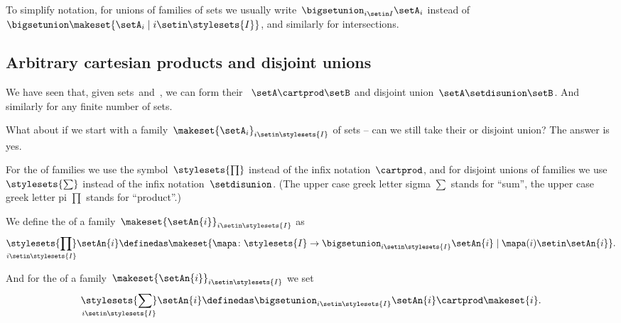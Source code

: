 \begin{remark}
    To simplify notation, for unions of families of sets we usually write~$\bigsetunion_{i \setin I} \setA_i $ instead of~$\bigsetunion \makeset{  \setA_i \mid i \setin\stylesets{I} }$, and similarly for intersections.
\end{remark}

\subsection{Arbitrary cartesian products and disjoint unions}

We have seen that, given sets~\setA and~\setB, we can form their ~$\setA \cartprod \setB$ and disjoint union~$\setA \setdisunion \setB$.
And similarly for any finite number of sets.

What about if we start with a family~$\makeset{ \setA_i }_{i \setin\stylesets{I}}$ of sets -- can we still take their  or disjoint union?
The answer is yes.

For the  of families we use the symbol~$\stylesets{\prod}$ instead of the infix notation~$\cartprod$, and for disjoint unions of families we use~$\stylesets{\sum}$ instead of the infix notation~$\setdisunion$.
(The upper case greek letter sigma $\sum$ stands for ``sum'', the upper case greek letter pi $\prod$ stands for ``product''.)

We define the  of a family~$\makeset{ \setAn{i} }_{i \setin\stylesets{I}}$ as
\begin{equation}
    \underset{i \setin\stylesets{I}}{\stylesets{\prod}}  \setAn{i}  \definedas \makeset{ \mapa \colon \stylesets{I} \to \bigsetunion_{i \setin\stylesets{I} } \setAn{i} \mid \mapa(i) \setin\setAn{i} }.
\end{equation}

And for the  of a family~$\makeset{ \setAn{i} }_{i \setin\stylesets{I}}$ we set
\begin{equation}
    \underset{i \setin\stylesets{I}}{\stylesets{\sum}} \setAn{i} \definedas \bigsetunion_{i \setin\stylesets{I}} \setAn{i} \cartprod \makeset{ i }.
\end{equation}

